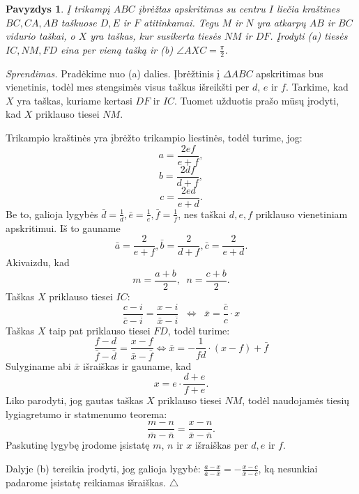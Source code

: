 \documentclass[11pt,a4paper,twoside]{book}
\newenvironment{sprendimas}{\noindent \textit{Sprendimas.}}{\hfill $\triangle$}
\newcounter{foo}[subsection]
\newtheorem{pavnr}[foo]{Pavyzdys}
\theoremstyle{definition} \newtheorem*{api}{Apibrėžimas}
\theoremstyle{remark} \newtheorem*{pastaba}{Pastaba}
\begin{document}
\begin{pavnr}
Į trikampį $ABC$ įbrėžtas apskritimas su centru $I$ liečia kraštines $BC, CA, AB$ taškuose $D, E$ ir $F$ atitinkamai. Tegu $M$ ir $N$ yra atkarpų $AB$ ir $BC$ vidurio taškai, o $X$ yra taškas, kur susikerta tiesės $NM$ ir $DF$. Įrodyti (a) tiesės $IC, NM, FD$ eina per vieną tašką ir (b) $\angle AXC = \frac{\pi}{2}$. 
\end{pavnr}

\begin{sprendimas}
Pradėkime nuo (a) dalies. Įbrėžtinis į $\Delta ABC$ apskritimas bus vienetinis, todėl mes stengsimės visus taškus išreikšti per $d$, $e$ ir $f$. Tarkime, kad $X$ yra taškas, kuriame kertasi $DF$ ir $IC$. Tuomet užduotis prašo mūsų įrodyti, kad $X$ priklauso tiesei $NM$. 

Trikampio kraštinės yra įbrėžto trikampio liestinės, todėl turime, jog:
$$ a =\frac{2ef}{e+f},$$
$$ b=\frac{2df}{d+f},$$
$$ c=\frac{2ed}{e+d}.$$
Be to, galioja lygybės $\bar{d}= \frac{1}{d}, \bar{e}= \frac{1}{e}, \bar{f}= \frac{1}{f}$, nes taškai $d, e, f$ priklauso vienetiniam apskritimui. Iš to gauname
$$ \bar a =\frac{2}{e+f}, \bar b=\frac{2}{d+f}, \bar c=\frac{2}{e+d}.$$
Akivaizdu, kad
$$ m=\frac{a+b}{2}, \phantom{a} n=\frac{c+b}{2}.$$
Taškas $X$ priklauso tiesei $IC$:
$$ \frac{c-i}{\bar{c}-\overline{i}}=\frac{x-i}{\bar{x} - \overline{i}} {\phantom{a}}\Leftrightarrow \phantom{a} \bar{x}= \frac{\bar{c}}{c}\cdot  x $$ 
Taškas $X$ taip pat priklauso tiesei $FD$, todėl turime:
$$\frac{f-d}{\bar{f}-\bar{d}}=\frac{x-f}{\bar{x} - \bar{f}} \Leftrightarrow \bar{x}= -\frac{1}{fd}\cdot  (x-f)+\bar{f} $$
Sulyginame abi $\bar{x}$ išraiškas ir gauname, kad 
$$ x = e \cdot \frac{d+e}{f+e}.$$
Liko parodyti, jog gautas taškas $X$ priklauso tiesei $NM$, todėl naudojamės tiesių lygiagretumo ir statmenumo teorema:
$$ \frac{m-n}{\bar{m}-\bar{n}}=\frac{x-n}{\bar{x} - \bar{n}}.$$
Paskutinę lygybę įrodome įsistatę $m$, $n$ ir $x$ išraiškas per $d, e$ ir $f$.

Dalyje (b) tereikia įrodyti, jog galioja lygybė: $\frac{a-x}{\bar{a}-\bar{x}}= - \frac{x-c}{\bar{x} - \bar{c}}$, ką nesunkiai padarome įsistatę reikiamas išraiškas.
\end{sprendimas}
\end{document}
